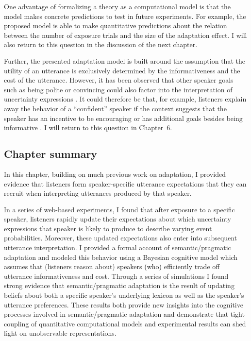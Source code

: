 One advantage of formalizing a theory as a computational model is that the model 
makes concrete predictions to test in future experiments. For example, the proposed
model is able to make quantitative predictions about the relation between the number of exposure
trials and the size of the adaptation effect. I will also return to this question in the discussion of the next chapter.

Further, the presented adaptation model is built around the assumption that the utility of an utterance is exclusively determined
by the informativeness and the cost of the utterance. However, it has been observed that other speaker goals such as being polite or
convincing could also factor into the interpretation of uncertainty expressions \parencite[see e.g,][]{Pighin2011,Juanchich2013,Holtgraves2016}.
It could therefore be that, for example, listeners explain away the behavior of a ``confident'' speaker if the context suggests that the speaker
has an incentive to be encouraging or has additional goals besides being informative \parencite[see also][]{Yoon2016,Yoon2017}. I will return to this question in Chapter~6.


\subsection{Chapter summary}

In this chapter, building on much previous work on adaptation, I provided evidence that listeners form speaker-specific utterance expectations that they can recruit when interpreting utterances produced by that speaker.

In a series of web-based experiments, I found that after exposure to a specific speaker, listeners rapidly update 
their expectations about which uncertainty expressions that speaker is likely to produce
to describe varying event probabilities. Moreover, these updated expectations also enter into subsequent utterance interpretation.
I provided a formal account of semantic/pragmatic adaptation and modeled this behavior using a Bayesian cognitive model 
which assumes that (listeners reason about) speakers (who) efficiently trade off utterance informativeness and cost.
Through a series of simulations I found strong evidence that semantic/pragmatic adaptation is the result of
updating beliefs about both a specific speaker's underlying lexicon as well as the speaker's utterance
preferences. These results both provide new insights into the cognitive processes involved in semantic/pragmatic adaptation
and demonstrate that tight coupling of quantitative computational models and experimental results can shed light on
unobservable representations.
